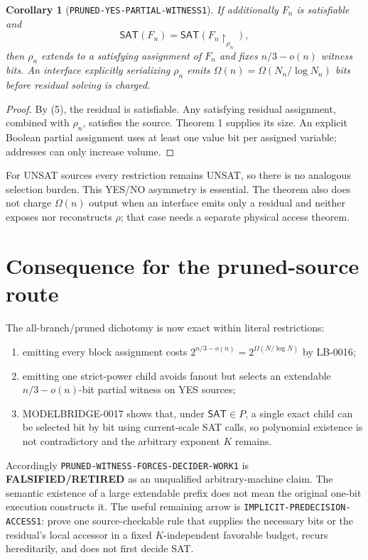 \documentclass[11pt]{article}
\newtheorem{corollary}[theorem]{Corollary}
\newcommand{\SAT}{\mathsf{SAT}}
\newcommand{\RETIRED}{\textbf{FALSIFIED/RETIRED}}
\begin{document}
\begin{corollary}[\texttt{PRUNED-YES-PARTIAL-WITNESS1}]
If additionally $F_n$ is satisfiable and
\[
 \SAT(F_n)=\SAT(F_n\upharpoonright_{\rho_n}),           \tag{5}
\]
then $\rho_n$ extends to a satisfying assignment of $F_n$ and fixes
$n/3-o(n)$ witness bits.  An interface explicitly serializing $\rho_n$ emits
$\Omega(n)=\Omega(N_n/\log N_n)$ bits before residual solving is charged.
\end{corollary}

\begin{proof}
By (5), the residual is satisfiable.  Any satisfying residual assignment,
combined with $\rho_n$, satisfies the source.  Theorem 1 supplies its size.
An explicit Boolean partial assignment uses at least one value bit per
assigned variable; addresses can only increase volume.
\end{proof}

For UNSAT sources every restriction remains UNSAT, so there is no analogous
selection burden.  This YES/NO asymmetry is essential.  The theorem also does
not charge $\Omega(n)$ output when an interface emits only a residual and
neither exposes nor reconstructs $\rho$; that case needs a separate physical
access theorem.

\section{Consequence for the pruned-source route}

The all-branch/pruned dichotomy is now exact within literal restrictions:
\begin{enumerate}[leftmargin=*]
\item emitting every block assignment costs
$2^{n/3-o(n)}=2^{\Omega(N/\log N)}$ by LB-0016;
\item emitting one strict-power child avoids fanout but selects an extendable
$n/3-o(n)$-bit partial witness on YES sources;
\item MODELBRIDGE-0017 shows that, under $\SAT\in P$, a single exact child can
be selected bit by bit using current-scale SAT calls, so polynomial existence
is not contradictory and the arbitrary exponent $K$ remains.
\end{enumerate}

Accordingly \texttt{PRUNED-WITNESS-FORCES-DECIDER-WORK1} is \RETIRED{} as an
unqualified arbitrary-machine claim.  The semantic existence of a large
extendable prefix does not mean the original one-bit execution constructs it.
The useful remaining arrow is \texttt{IMPLICIT-PREDECISION-ACCESS1}: prove one
source-checkable rule that supplies the necessary bits or the residual's
local accessor in a fixed $K$-independent favorable budget, recurs
hereditarily, and does not first decide SAT.
\end{document}

